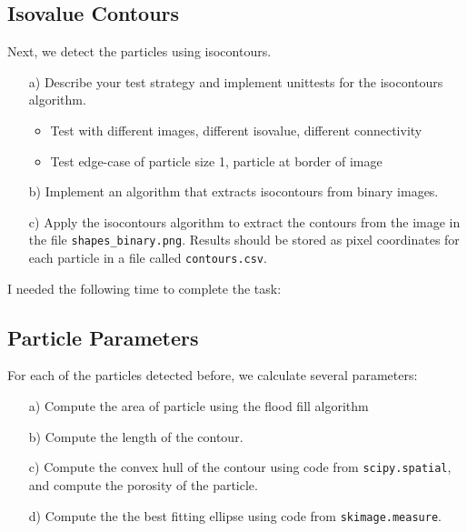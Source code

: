 \documentclass{article}
\begin{document}
\subsection{Isovalue Contours}

Next, we detect the particles using isocontours. 

\begin{enumerate}

\item[a)] Describe your test strategy and implement unittests for the isocontours algorithm.
\begin{itemize}
    \item Test with different images, different isovalue, different connectivity
    \item Test edge-case of particle size 1, particle at border of image
\end{itemize}

\item[b)] Implement an algorithm that extracts isocontours from binary images. 

\item[c)] Apply the isocontours algorithm to extract the contours from the image in the file \texttt{shapes\_binary.png}. Results should be stored as pixel coordinates for each particle in a file called \texttt{contours.csv}.

\end{enumerate}

I needed the following time to complete the task:

\subsection{Particle Parameters}

For each of the particles detected before, we calculate several parameters:

\begin{enumerate}

\item[a)] Compute the area of particle using the flood fill algorithm

\item[b)] Compute the length of the contour.

\item[c)] Compute the convex hull of the contour using code from \texttt{scipy.spatial}, and compute the porosity of the particle.

\item[d)] Compute the the best fitting ellipse using code from \texttt{skimage.measure}.

\end{enumerate}
\end{document}
